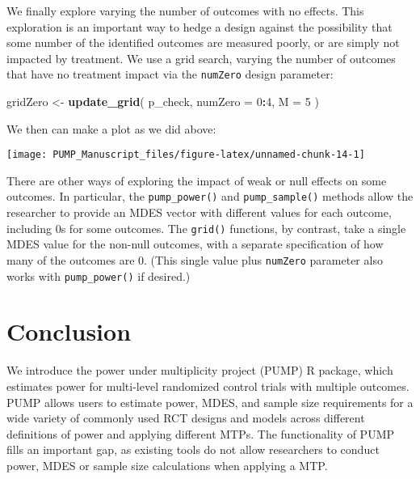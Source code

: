 \documentclass[
]{article}
\newenvironment{Shaded}{\begin{snugshade}}{\end{snugshade}}
\newcommand{\DataTypeTok}[1]{\textcolor[rgb]{0.13,0.29,0.53}{#1}}
\newcommand{\DecValTok}[1]{\textcolor[rgb]{0.00,0.00,0.81}{#1}}
\newcommand{\KeywordTok}[1]{\textcolor[rgb]{0.13,0.29,0.53}{\textbf{#1}}}
\newcommand{\NormalTok}[1]{#1}
\newcommand{\OperatorTok}[1]{\textcolor[rgb]{0.81,0.36,0.00}{\textbf{#1}}}
\newcommand{\StringTok}[1]{\textcolor[rgb]{0.31,0.60,0.02}{#1}}
\begin{document}
We finally explore varying the number of outcomes with no effects. This
exploration is an important way to hedge a design against the
possibility that some number of the identified outcomes are measured
poorly, or are simply not impacted by treatment. We use a grid search,
varying the number of outcomes that have no treatment impact via the
\texttt{numZero} design parameter:

\begin{Shaded}
\begin{Highlighting}[]
\NormalTok{gridZero \textless{}{-}}\StringTok{ }\KeywordTok{update\_grid}\NormalTok{( p\_check,}
            \DataTypeTok{numZero =} \DecValTok{0}\OperatorTok{:}\DecValTok{4}\NormalTok{,}
            \DataTypeTok{M =} \DecValTok{5}\NormalTok{ )}
\end{Highlighting}
\end{Shaded}

We then can make a plot as we did above:

\begin{center}\texttt{[image: PUMP\_Manuscript\_files/figure-latex/unnamed-chunk-14-1]} \end{center}

There are other ways of exploring the impact of weak or null effects on
some outcomes. In particular, the \texttt{pump\_power()} and
\texttt{pump\_sample()} methods allow the researcher to provide an MDES
vector with different values for each outcome, including 0s for some
outcomes. The \texttt{grid()} functions, by contrast, take a single MDES
value for the non-null outcomes, with a separate specification of how
many of the outcomes are 0. (This single value plus \texttt{numZero}
parameter also works with \texttt{pump\_power()} if desired.)

\section{Conclusion}
\label{sec:conclusion}

We introduce the power under multiplicity project (PUMP) R package,
which estimates power for multi-level randomized control trials with
multiple outcomes. PUMP allows users to estimate power, MDES, and sample
size requirements for a wide variety of commonly used RCT designs and
models across different definitions of power and applying different
MTPs. The functionality of PUMP fills an important gap, as existing
tools do not allow researchers to conduct power, MDES or sample size
calculations when applying a MTP.
\end{document}
